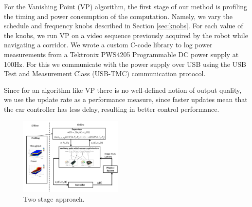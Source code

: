For the Vanishing Point (VP) algorithm, the first stage of our method is profiling the timing and power consumption of the computation.
Namely, we vary the schedule and frequency knobs described in Section \ref{sec:knobs}.
For each value of the knobs, we run VP on a video sequence previously acquired by the robot while navigating a corridor. 
We wrote a custom C-code library to log power measurements from a Tektronix PWS4205 Programmable DC power supply at 100Hz. 
For this we communicate with the power supply over USB using the USB Test and Measurement Class (USB-TMC) communication protocol. 
 
Since for an algorithm like VP there is no well-defined notion of output quality, we use the update rate as a performance measure, since faster updates mean that the car controller has less delay, resulting in better control performance. 

\begin{figure}[t]
	\centering
	\includegraphics[width=0.46\textwidth]{Figs/bigFig.pdf}
	\caption{Two stage approach.}
	\label{fig:juicyj}%
\end{figure} 


